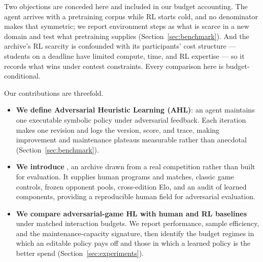 Two objections are conceded here and included in our budget accounting. The agent
arrives with a pretraining corpus while RL starts cold, and no denominator makes
that symmetric; we report environment steps as what is scarce in a new domain and test
what pretraining supplies (Section~\ref{sec:benchmark}). And the archive's RL
scarcity is confounded with its participants' cost structure --- students on a deadline
have limited compute, time, and RL expertise --- so it records what wins under contest
constraints. Every comparison here is budget-conditional.

Our contributions are threefold.

\begin{itemize}[leftmargin=*]
  \item \textbf{We define Adversarial Heuristic Learning (AHL)}: an agent maintains
  one executable symbolic policy under adversarial feedback. Each iteration makes
  one revision and logs the version, score, and trace, making improvement and
  maintenance plateaus measurable rather than anecdotal (Section~\ref{sec:benchmark}).

  \item \textbf{We introduce \benchname}, an archive drawn from a real competition
  rather than built for evaluation. It supplies human programs and matches, classic
  game controls, frozen opponent pools, cross-edition Elo, and an audit of learned
  components, providing a reproducible human field for adversarial evaluation.

  \item \textbf{We compare adversarial-game HL with human and RL baselines} under
  matched interaction budgets. We report performance, sample efficiency, and the
  maintenance-capacity signature, then identify the budget regimes in which an
  editable policy pays off and those in which a learned policy is the better spend
  (Section~\ref{sec:experiments}).
\end{itemize}
